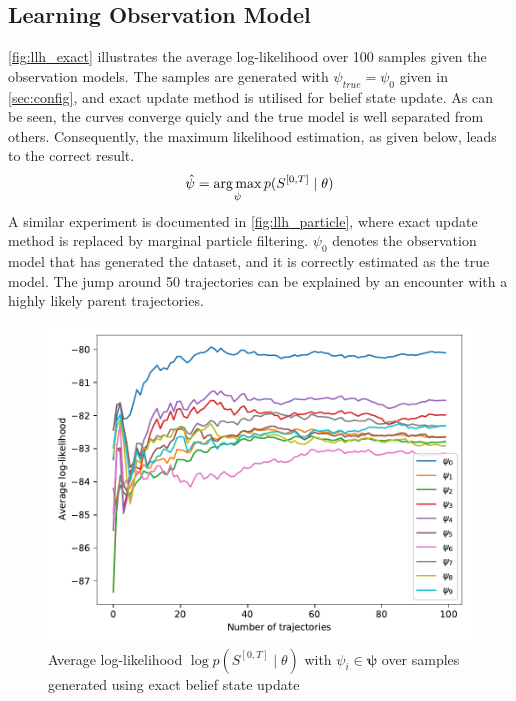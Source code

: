 \subsection{Learning Observation Model}
\autoref{fig:llh_exact} illustrates the average log-likelihood over 100 samples given the observation models. The samples are generated with $ \psi_{true} = \psi_0 $ given in \cref{sec:config}, and exact update method is utilised for belief state update. As can be seen, the curves converge quicly and the true model is well separated from others. Consequently, the maximum likelihood estimation, as given below, leads to the correct result. 
\begin{equation}
\hat{\psi} = \operatorname*{arg\,max}_\psi p(S^{[0,T]} \mid \theta )
\label{eq:max_llh_est}
\end{equation}
A similar experiment is documented in \autoref{fig:llh_particle}, where exact update method is replaced by marginal particle filtering. $ \psi_0 $ denotes the observation model that has generated the dataset, and it is correctly estimated as the true model. The jump around 50 trajectories can be explained by an encounter with a highly likely parent trajectories.
\begin{figure}[H]
	\begin{center}
		\includegraphics[width=.7\textwidth]{figures/roc_analysis/roc_exactUpdate/llh_exactUpdate_psi_0}
		\caption[Average log-likelihood in the case of exact belief update]{Average log-likelihood $ \log p(S^{[0,T]} \mid \theta) $ with $ \psi_i \in \symbf{\psi} $ over samples generated using exact belief state update}
		\label{fig:llh_exact}
	\end{center}
\end{figure}
